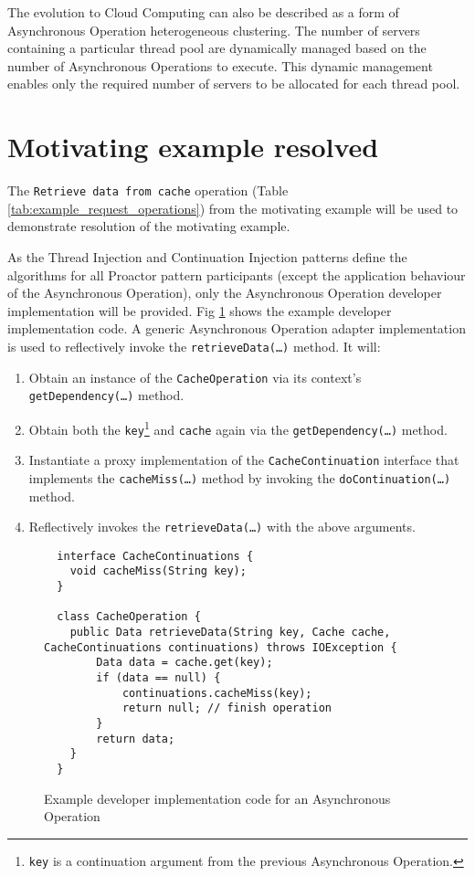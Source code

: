 \documentclass[prodmode]{style/acmlarge}
\begin{document}
The evolution to Cloud Computing can also be described as a form of Asynchronous
Operation heterogeneous clustering.  The number of servers containing a
particular thread pool are dynamically managed based on the number of
Asynchronous Operations to execute.  This dynamic management enables only the
required number of servers to be allocated for each thread pool.


\section{Motivating example resolved}

The \texttt{Retrieve data from cache} operation (Table
\ref{tab:example_request_operations}) from the motivating example will be used
to demonstrate resolution of the motivating example.  

As the Thread Injection and Continuation Injection patterns define the
algorithms for all Proactor pattern participants (except the application
behaviour of the Asynchronous Operation), only the Asynchronous Operation
developer implementation will be provided.  Fig
\ref{fig:Example_Method_Operation} shows the example developer implementation
code.  A generic Asynchronous Operation adapter implementation is used to
reflectively invoke the \texttt{retrieveData(\ldots)} method. It will:
\begin{enumerate}
  \item Obtain an instance of the \texttt{CacheOperation} via its context's \texttt{getDependency(\ldots)} method.
  \item Obtain both the \texttt{key}\footnote{\texttt{key} is a continuation argument from the previous Asynchronous Operation.} and \texttt{cache} again via the \texttt{getDependency(\ldots)} method.
  \item Instantiate a proxy implementation of the \texttt{CacheContinuation} interface that implements the \texttt{cacheMiss(\ldots)} method by invoking the \texttt{doContinuation(\ldots)} method. 
  \item Reflectively invokes the \texttt{retrieveData(\ldots)} with the above arguments.
\end{enumerate}

\begin{figure}[tp]
\centering
\begin{verbatim}
  interface CacheContinuations {
    void cacheMiss(String key);
  }

  class CacheOperation {    
    public Data retrieveData(String key, Cache cache, CacheContinuations continuations) throws IOException {
        Data data = cache.get(key);
        if (data == null) {
            continuations.cacheMiss(key);
            return null; // finish operation
        }
        return data;
    }
  }
\end{verbatim}
\caption{Example developer implementation code for an Asynchronous Operation}
\label{fig:Example_Method_Operation}
\end{figure}
\end{document}
